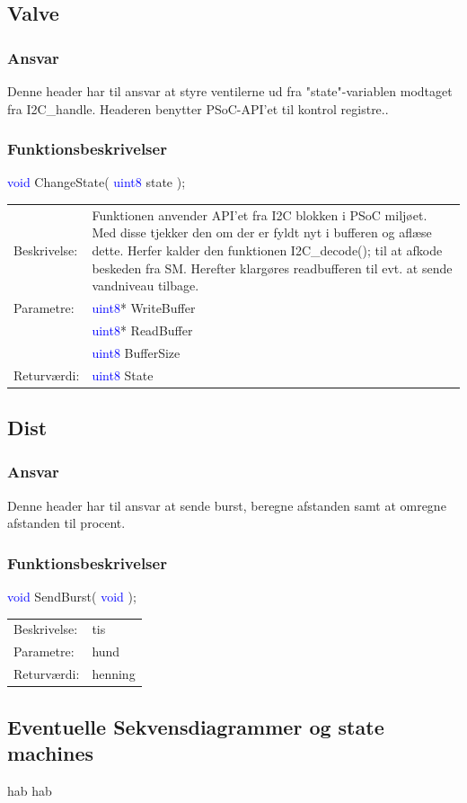 \subsection{Valve}
\subsubsection{Ansvar}
Denne header har til ansvar at styre ventilerne ud fra "state"-variablen modtaget fra I2C\_handle. Headeren benytter PSoC-API'et til kontrol registre..
\subsubsection{Funktionsbeskrivelser}
\textcolor{blue}{void} ChangeState( \textcolor{blue}{uint8} state ); 
\begin{table}[H]
\begin{tabular}{l p{12.5cm}}
\hline
Beskrivelse:& Funktionen anvender API'et fra I2C blokken i PSoC miljøet. Med disse tjekker den om der er fyldt nyt i bufferen og aflæse dette. Herfer kalder den funktionen I2C\_decode(); til at afkode beskeden fra SM. Herefter klargøres readbufferen til evt. at sende vandniveau tilbage. \\
Parametre:&\textcolor{blue}{uint8}* WriteBuffer\\
&\textcolor{blue}{uint8}* ReadBuffer\\
&\textcolor{blue}{uint8} BufferSize \\
Returværdi:& \textcolor{blue}{uint8} State\\
\end{tabular}
\end{table}

\subsection{Dist}
\subsubsection{Ansvar}
Denne header har til ansvar at sende burst, beregne afstanden samt at omregne afstanden til procent.
\subsubsection{Funktionsbeskrivelser}
\textcolor{blue}{void} SendBurst( \textcolor{blue}{void} );
\begin{table}[H]
\begin{tabular}{l p{12.5cm}}
\hline
Beskrivelse:&tis\\
Parametre:&hund\\
Returværdi:& henning\\
\end{tabular}
\end{table}
\subsection{Eventuelle Sekvensdiagrammer og state machines}
hab hab